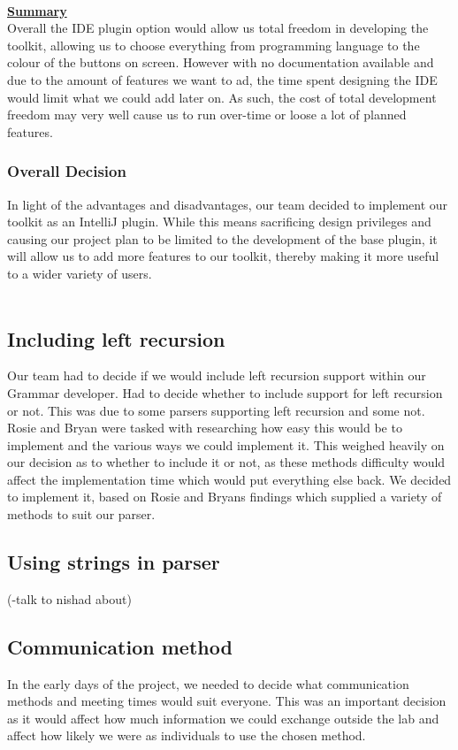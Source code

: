 \\
\textbf {\underline{Summary}}\\
 Overall the IDE plugin option would allow us total freedom in developing the toolkit, allowing us to choose everything from programming language to the colour of the buttons on screen. However with no documentation available and due to the amount of features we want to ad, the time spent designing the IDE would limit what we could add later on. As such, the cost of total development freedom may very well cause us to run over-time or loose a lot of planned features.

\subsubsection{Overall Decision}
In light of the advantages and disadvantages, our team decided to implement our toolkit as an IntelliJ plugin. While this means sacrificing design privileges and causing our project plan to be limited to the development of the base plugin, it will allow us to add more features to our toolkit, thereby making it more useful to a wider variety of users.\\
\\ 

\subsection{Including left recursion}
Our team had to decide if we would include left recursion support within our Grammar developer. Had to decide whether to include support for left recursion or not. This was due to some parsers supporting left recursion and some not. Rosie and Bryan were tasked with researching how easy this would be to implement and the various ways we could implement it. This weighed heavily on our decision as to whether to include it or not, as these methods difficulty would affect the implementation time which would put everything else back. We decided to implement it, based on Rosie and Bryans findings which supplied a variety of methods to suit our parser.




\subsection{Using strings in parser}
(-talk to nishad about) %


\subsection{Communication method}
In the early days of the project, we needed to decide what communication methods and meeting times would suit everyone. This was an important decision as it would affect how much information we could exchange outside the lab and affect how likely we were as individuals to use the chosen method.\\
